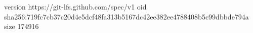 version https://git-lfs.github.com/spec/v1
oid sha256:719fc7cb37c20d4e5dcf48fa313b5167dc42ee382ee4788408b5c99dbbde794a
size 174916
